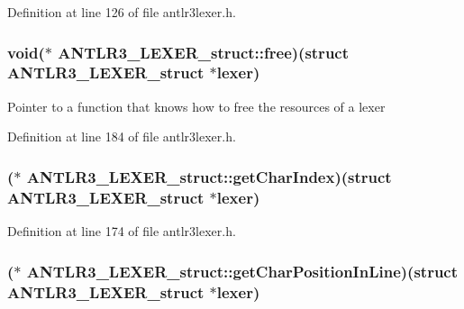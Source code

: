 Definition at line 126 of file antlr3lexer.\-h.

\hypertarget{struct_a_n_t_l_r3___l_e_x_e_r__struct_a793226480ca08fbcac7b61578fb2430c}{
\subsubsection[{free}]{\setlength{\rightskip}{0pt plus 5cm}void($\ast$ A\-N\-T\-L\-R3\-\_\-\-L\-E\-X\-E\-R\-\_\-struct\-::free)(struct {\bf A\-N\-T\-L\-R3\-\_\-\-L\-E\-X\-E\-R\-\_\-struct} $\ast$lexer)}}\label{struct_a_n_t_l_r3___l_e_x_e_r__struct_a793226480ca08fbcac7b61578fb2430c}
Pointer to a function that knows how to free the resources of a lexer 

Definition at line 184 of file antlr3lexer.\-h.

\hypertarget{struct_a_n_t_l_r3___l_e_x_e_r__struct_a3c09f36c7367d7755563155adcabdcc1}{
\subsubsection[{get\-Char\-Index}]{($\ast$ A\-N\-T\-L\-R3\-\_\-\-L\-E\-X\-E\-R\-\_\-struct\-::get\-Char\-Index)(struct {\bf A\-N\-T\-L\-R3\-\_\-\-L\-E\-X\-E\-R\-\_\-struct} $\ast$lexer)}}\label{struct_a_n_t_l_r3___l_e_x_e_r__struct_a3c09f36c7367d7755563155adcabdcc1}


Definition at line 174 of file antlr3lexer.\-h.

\hypertarget{struct_a_n_t_l_r3___l_e_x_e_r__struct_a2b5e18cf9d9b55bfcc02d345c5e8f848}{
\subsubsection[{get\-Char\-Position\-In\-Line}]{($\ast$ A\-N\-T\-L\-R3\-\_\-\-L\-E\-X\-E\-R\-\_\-struct\-::get\-Char\-Position\-In\-Line)(struct {\bf A\-N\-T\-L\-R3\-\_\-\-L\-E\-X\-E\-R\-\_\-struct} $\ast$lexer)}}\label{struct_a_n_t_l_r3___l_e_x_e_r__struct_a2b5e18cf9d9b55bfcc02d345c5e8f848}


